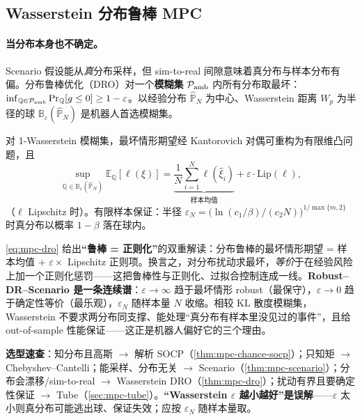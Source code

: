 \subsection{Wasserstein 分布鲁棒 MPC}
\label{sec:mpc-dro}
\paragraph{当分布本身也不确定。}
Scenario 假设能从\emph{真}分布采样，但 sim-to-real 间隙意味着真分布与样本分布有偏。分布鲁棒优化（DRO）对一个\textbf{模糊集} $\mathcal P_{\rm amb}$ 内所有分布取最坏：$\inf_{\mathbb Q\in\mathcal P_{\rm amb}}\Pr_{\mathbb Q}[g\le0]\ge1-\varepsilon$。以经验分布 $\hat{\mathbb P}_N$ 为中心、Wasserstein 距离 $W_p$ 为半径的球 $\mathbb B_\varepsilon(\hat{\mathbb P}_N)$ 是机器人首选模糊集。

\begin{theorem}
\label{thm:mpc-dro}
对 1-Wasserstein 模糊集，最坏情形期望经 Kantorovich 对偶可重构为有限维凸问题，且
\begin{equation}
  \sup_{\mathbb Q\in\mathbb B_\varepsilon(\hat{\mathbb P}_N)}\mathbb E_{\mathbb Q}[\ell(\xi)]=\underbrace{\frac1N\sum_{i=1}^N\ell(\hat\xi_i)}_{\text{样本均值}}+\varepsilon\cdot\mathrm{Lip}(\ell),
  \label{eq:mpc-dro}
\end{equation}
（$\ell$ Lipschitz 时）。有限样本保证：半径 $\varepsilon_N=\big(\ln(c_1/\beta)/(c_2N)\big)^{1/\max\{m,2\}}$ 时真分布以概率 $1-\beta$ 落在球内。
\end{theorem}

\begin{insight}
\cref{eq:mpc-dro} 给出\textbf{“鲁棒 = 正则化”}的双重解读：分布鲁棒的最坏情形期望 = 样本均值 + $\varepsilon\times$ Lipschitz 正则项。换言之，对分布扰动求最坏，\emph{等价}于在经验风险上加一个正则化惩罚——这把鲁棒性与正则化、过拟合控制连成一线。\textbf{Robust--DR--Scenario 是一条连续谱}：$\varepsilon\to\infty$ 趋于最坏情形 robust（最保守），$\varepsilon\to0$ 趋于确定性等价（最乐观），$\varepsilon_N$ 随样本量 $N$ 收缩。相较 KL 散度模糊集，Wasserstein 不要求两分布同支撑、能处理“真分布有样本里没见过的事件”，且给 out-of-sample 性能保证——这正是机器人偏好它的三个理由。
\end{insight}

\begin{remark}
\textbf{选型速查}：知分布且高斯 $\to$ 解析 SOCP（\cref{thm:mpc-chance-socp}）；只知矩 $\to$ Chebyshev--Cantelli；能采样、分布无关 $\to$ Scenario（\cref{thm:mpc-scenario}）；分布会漂移/sim-to-real $\to$ Wasserstein DRO（\cref{thm:mpc-dro}）；扰动有界且要确定性保证 $\to$ Tube（\cref{sec:mpc-tube}）。\textbf{“Wasserstein $\varepsilon$ 越小越好”是误解}——$\varepsilon$ 太小则真分布可能逃出球、保证失效；应按 $\varepsilon_N$ 随样本量取。
\end{remark}

